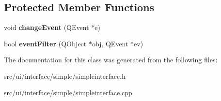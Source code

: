\subsection*{Protected Member Functions}
\begin{DoxyCompactItemize}
\item 
\hypertarget{classSimpleInterface_a3d6a284b9a637e72862dd0377fc8db25}{
void {\bfseries changeEvent} (QEvent $\ast$e)}
\label{classSimpleInterface_a3d6a284b9a637e72862dd0377fc8db25}

\item 
\hypertarget{classSimpleInterface_ab36a7f7acac697ef5a180cff44d6406e}{
bool {\bfseries eventFilter} (QObject $\ast$obj, QEvent $\ast$ev)}
\label{classSimpleInterface_ab36a7f7acac697ef5a180cff44d6406e}

\end{DoxyCompactItemize}


The documentation for this class was generated from the following files:\begin{DoxyCompactItemize}
\item 
src/ui/interface/simple/simpleinterface.h\item 
src/ui/interface/simple/simpleinterface.cpp\end{DoxyCompactItemize}
